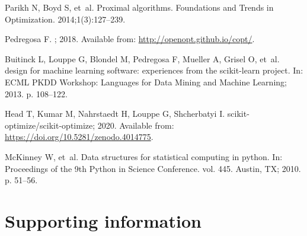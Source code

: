 \documentclass[10pt,letterpaper]{article}
\begin{document}
\begin{thebibliography}{100}
Parikh N, Boyd S, et~al.
\newblock Proximal algorithms.
\newblock Foundations and Trends in Optimization. 2014;1(3):127--239.

Pedregosa F.
; 2018.
\newblock Available from: \url{http://openopt.github.io/copt/}.

Buitinck L, Louppe G, Blondel M, Pedregosa F, Mueller A, Grisel O, et~al.
 design for machine learning software: experiences from the
  scikit-learn project.
\newblock In: ECML PKDD Workshop: Languages for Data Mining and Machine
  Learning; 2013. p. 108--122.

Head T, Kumar M, Nahrstaedt H, Louppe G, Shcherbatyi I.
  scikit-optimize/scikit-optimize; 2020.
\newblock Available from: \url{https://doi.org/10.5281/zenodo.4014775}.

McKinney W, et~al.
\newblock Data structures for statistical computing in python.
\newblock In: Proceedings of the 9th Python in Science Conference. vol. 445.
  Austin, TX; 2010. p. 51--56.

\end{thebibliography}


\section*{Supporting information}
\end{document}
